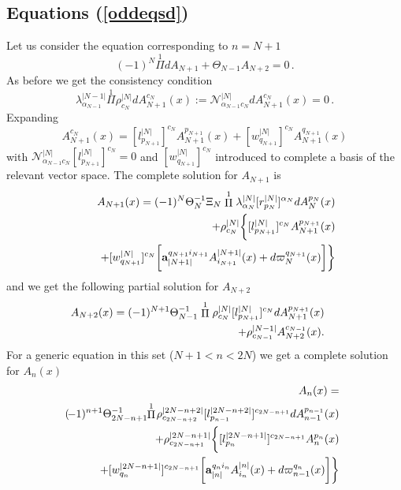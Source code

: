 \documentclass[prd,a4paper,twocolumn,amssymb,amsmath,nofootinbib,showpacs]{revtex4}
\begin{document}
\subsection{\label{Eqoddd} Equations (\ref{oddeqsd})}

\noindent Let us consider the equation corresponding to $n=N+1$
$$
(-1)^N\stackrel{1}{\Pi}dA_{N+1}+\Theta_{N-1}A_{N+2}=0\,.
$$
As before we get the consistency condition
$$
\lambda_{\alpha_{N-1}}^{|N-1|}\stackrel{1}{\Pi}
\rho_{c_N}^{|N|}dA_{N+1}^{c_N}(x):=
\mathcal{N}^{|N|}_{\alpha_{N-1}c_N}dA_{N+1}^{c_N}(x)=0\,.
$$
Expanding
$$
A_{N+1}^{c_N}(x)=[l^{|N|}_{p_{N+1}}]^{c_N}A^{p_{N+1}}_{N+1}(x)+
[w^{|N|}_{q_{N+1}}]^{c_N}A_{N+1}^{q_{N+1}}(x)
$$
with
$\mathcal{N}^{|N|}_{\alpha_{N-1}c_N}[l^{|N|}_{p_{N+1}}]^{c_N}=0$
and $[w^{|N|}_{q_{N+1}}]^{c_N}$ introduced to complete a basis of
the relevant vector space. The complete solution for $A_{N+1}$ is
\begin{eqnarray}
&&\hspace{-.5cm}A_{N+1}(x)=(-1)^N\Theta^{-1}_N\Xi_N
\stackrel{1}{\Pi}\lambda_{\alpha_N}^{|N|}
[r_{p_N}^{|N|}]^{\alpha_N}dA_N^{p_N}(x)\nonumber\\
&&\hspace{-.5cm}+\rho_{c_N}^{|N|}
\bigg\{[l_{p_{N+1}}^{|N|}]^{c_N}A_{N+1}^{p_{N+1}}(x)\label{SolCompoddAN+1}\\
&&\hspace{.5cm}+[w_{q_{N+1}}^{|N|}]^{c_N}\bigg[
\mathbf{a}_{|N+1|}^{q_{N+1}i_{N+1}}A_{i_{N+1}}^{|N+1|}(x)+
d\varpi_N^{q_{N+1}}(x)\bigg]\bigg\}\nonumber
\end{eqnarray}
and we get the following partial solution for $A_{N+2}$
\begin{eqnarray}
&&\hspace{-.8cm}A_{N+2}(x)=(-1)^{N+1}\Theta_{N-1}^{-1}\stackrel{1}{\Pi}
\rho_{c_N}^{|N|} [l^{|N|}_{p_{N+1}}]^{c_N} dA_{N+1}^{p_{N+1}}(x)\nonumber\\
&&\hspace{1cm}+
\rho_{c_{N-1}}^{|N-1|}A_{N+2}^{c_{N-1}}(x).\label{solparoddAN+2}
\end{eqnarray}
For a generic equation in this set ($N+1<n<2N$) we get a complete
solution for $A_n(x)$
\begin{eqnarray}
&&\hspace{-.5cm}A_n(x)=\nonumber\\
&&\hspace{-.5cm}(\!-1)^{n+1}\Theta^{-1}_{2N-n+1}
\!\!\stackrel{1}{\Pi}\!\rho_{c_{2N-n+2}}^{|2N-n+2|}
[l_{p_{n-1}}^{|2N-n+2|}]^{c_{2N-n+1}}dA_{n-1}^{p_{n-1}}(x)\nonumber\\
&&\hspace{-.5cm}+\rho_{c_{2N-n+1}}^{|2N-n+1|}
\bigg\{[l_{p_n}^{|2N-n+1|}]^{c_{2N-n+1}}A_n^{p_n}(x)\label{SolCompoddAn}\\
&&\hspace{.6cm}+[w_{q_n}^{|2N-n+1|}]^{c_{2N-n+1}}
\bigg[\mathbf{a}_{|n|}^{q_n i_n}A_{i_n}^{|n|}(x)+
d\varpi_{n-1}^{q_n}(x)\bigg]\bigg\}\nonumber
\end{eqnarray}
\end{document}
